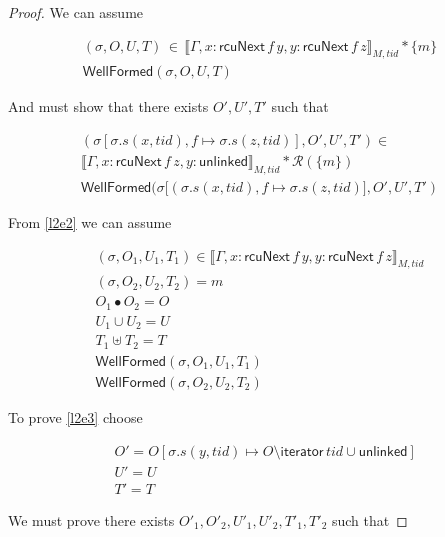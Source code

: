 \begin{proof}

We can  assume 

\begin{gather} \label{l2e2}
(\sigma,O,U,T) \, \in \, \llbracket \Gamma,x:\mathsf{rcuNext} \, f \, y, y:\mathsf{rcuNext} \, f \, z \rrbracket_{M,tid} * \{m\}
\\
\label{l2ewfa}
\textsf{WellFormed}(\sigma,O,U,T)
\end{gather}

And must show that there exists $O',U',T'$ such that

\begin{gather} \label{l2e3}
(  \sigma [ \sigma.s(x,tid),f \mapsto \sigma.s(z,tid) ]  , O', U', T') \in \\
 \llbracket \Gamma,x:\mathsf{rcuNext} \, f \,z, y:\mathsf{unlinked} \rrbracket_{M,tid} * \mathcal{R}(\{m\})
\\
\label{l2ewfa}
\textsf{WellFormed}(  \sigma [ (\sigma.s(x,tid),f \mapsto \sigma.s(z,tid) ] , O', U', T')
\end{gather}

From \ref{l2e2} we can assume 


\begin{gather} \label{l2e4}
(\sigma, O_{1}, U_{1}, T_{1}) \in \llbracket \Gamma, x:\mathsf{rcuNext} \, f \, y, y:\mathsf{rcuNext} \, f  \,z\rrbracket_{M,tid}
\\
 \label{l2e5}
(\sigma, O_{2}, U_{2}, T_{2}) = m 
\\
\label{l2e6}
O_{1} \bullet O_{2} = O
\\
 \label{l2e7}
U_{1} \cup U_{2} = U
\\
 \label{l2e8}
T_{1} \uplus T_{2} = T
\\
\label{l2wfa1}
\textsf{WellFormed}(\sigma,O_{1},U_{1},T_{1})
\\
\label{l2wfa2}
\textsf{WellFormed}(\sigma,O_{2},U_{2},T_{2})
\end{gather}

To prove \ref{l2e3} choose

\[
\begin{array}{cl}
&O' = O[\sigma.s(y,tid) \mapsto O \setminus \mathsf{iterator} \, tid  \cup \mathsf{unlinked}]\\
&U' = U\\
&T' = T
\end{array}
\]

We must prove there exists $O'_{1}, O'_{2}, U'_{1}, U'_{2}, T'_{1}, T'_{2}$ such that



\end{proof}
